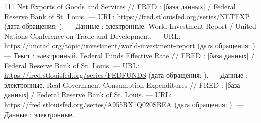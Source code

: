 \begin{RaggedRight}
\begin{thebibliography}{111}
     \hypertarget{bib:FRED-NETEXP}{} Net Exports of Goods and Services // FRED : [база данных] / Federal Reserve Bank of St. Louis. --- URL: \url{https://fred.stlouisfed.org/series/NETEXP} (дата обращения: \bibaccessdate). --- Данные : электронные.
     \hypertarget{bib:UNCTAD}{} World Investment Report / United Nations Conference on Trade and Development. --- URL: \url{https://unctad.org/topic/investment/world-investment-report} (дата обращения: \bibaccessdate). --- Текст : электронный.
     \hypertarget{bib:FRED-FEDFUNDS}{} Federal Funds Effective Rate // FRED : [база данных] / Federal Reserve Bank of St. Louis. --- URL: \url{https://fred.stlouisfed.org/series/FEDFUNDS} (дата обращения: \bibaccessdate). --- Данные : электронные.
     \hypertarget{bib:FRED-A955RX1Q020SBEA}{} Real Government Consumption Expenditures // FRED : [база данных] / Federal Reserve Bank of St. Louis. --- URL: \url{https://fred.stlouisfed.org/series/A955RX1Q020SBEA} (дата обращения: \bibaccessdate). --- Данные : электронные.
\end{thebibliography}
\end{RaggedRight}
